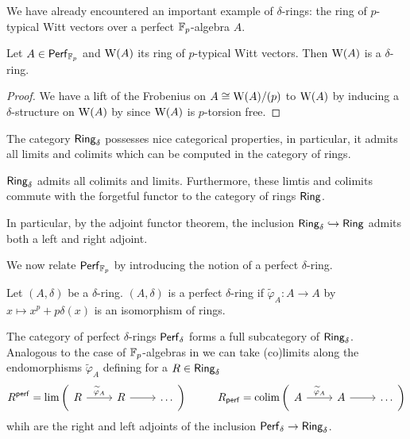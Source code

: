 We have already encountered an important example of $\delta$-rings: the ring of $p$-typical Witt vectors over a perfect $\mathbb{F}_{p}$-algebra $A$.
\begin{proposition}\label{prop: Witt vectors over Fp algebras are delta}
    Let $A\in\mathsf{Perf}_{\mathbb{F}_{p}}$ and $\mathrm{W}(A)$ its ring of $p$-typical Witt vectors. Then $\mathrm{W}(A)$ is a $\delta$-ring. 
\end{proposition}
\begin{proof}
    We have a lift of the Frobenius on $A\cong\mathrm{W}(A)/(p)$ to $\mathrm{W}(A)$ by  inducing a $\delta$-structure on $\mathrm{W}(A)$ by  since $\mathrm{W}(A)$ is $p$-torsion free. 
\end{proof}
The category $\mathsf{Ring}_{\delta}$ possesses nice categorical properties, in particular, it admits all limits and colimits which can be computed in the category of rings. 
\begin{lemma}\label{lem: limits and colimits in delta rings}
    $\mathsf{Ring}_{\delta}$ admits all colimits and limits. Furthermore, these limtis and colimits commute with the forgetful functor to the category of rings $\mathsf{Ring}$. 
\end{lemma}
In particular, by the adjoint functor theorem, the inclusion $\mathsf{Ring}_{\delta}\hookrightarrow\mathsf{Ring}$ admits both a left and right adjoint.

We now relate $\mathsf{Perf}_{\mathbb{F}_{p}}$ by introducing the notion of a perfect $\delta$-ring. 
\begin{definition}\label{def: perfect delta ring}
    Let $(A,\delta)$ be a $\delta$-ring. $(A,\delta)$ is a perfect $\delta$-ring if $\widetilde{\varphi}_{A}:A\to A$ by $x\mapsto x^{p}+p\delta(x)$ is an isomorphism of rings. 
\end{definition}
The category of perfect $\delta$-rings $\mathsf{Perf}_{\delta}$ forms a full subcategory of $\mathsf{Ring}_{\delta}$. Analogous to the case of $\mathbb{F}_{p}$-algebras in  we can take (co)limits along the endomorphisms $\widetilde{\varphi}_{A}$ defining for a $R\in\mathsf{Ring}_{\delta}$
$$R^{\perf}=\lim\left(
    \begin{tikzcd}
        R & R & \dots
        \arrow["{\widetilde{\varphi}_{A}}", from=1-1, to=1-2]
        \arrow[from=1-2, to=1-3]
    \end{tikzcd}\right)\hspace{1cm}R_{\perf}=\colim\left(
        \begin{tikzcd}
        A & A & \dots
        \arrow["{\widetilde{\varphi}_{A}}", from=1-1, to=1-2]
        \arrow[from=1-2, to=1-3]
    \end{tikzcd}\right)$$
whih are the right and left adjoints of the inclusion $\mathsf{Perf}_{\delta}\to\mathsf{Ring}_{\delta}$. 

